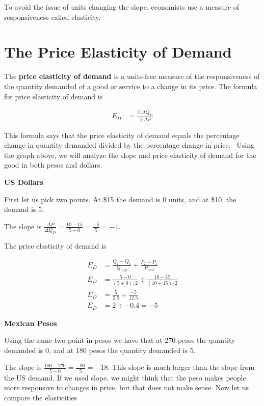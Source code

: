 \documentclass[
]{book}
\begin{document}
To avoid the issue of units changing the slope, economists use a measure of responsiveness called elasticity.

\section{The Price Elasticity of Demand}\label{the-price-elasticity-of-demand}

The \textbf{price elasticity of demand} is a units-free measure of the responsiveness of the quantity demanded of a good or service to a change in its price. The formula for price elasticity of demand is

\begin{align*}
E_D &= \frac{\% \Delta Q_D}{\% \Delta P}
\end{align*}

This formula says that the price elasticity of demand equals the percentage change in quantity demanded divided by the percentage change in price.~
Using the graph above, we will analyze the slope and price elasticity of demand for the good in both pesos and dollars.

\textbf{US Dollars}

First let us pick two points. At \$15 the demand is 0 units, and at \$10, the demand is 5.

The slope is \(\frac{\Delta P}{\Delta Q_D} = \frac{10 - 15}{5 - 0} = \frac{-5}{5} = -1\).

The price elasticity of demand is

\begin{align*}
E_D &= \frac{Q_2 - Q_1}{Q_{mid}}\div \frac{P_2 - P_1}{P_{mid}}\\
E_D &= \frac{5 - 0}{(5+0)/2} \div \frac{10 - 15}{(10+15)/2}\\
E_D &= \frac{5}{2.5}\div \frac{-5}{12.5}\\
E_D &= 2 \div -0.4 = -5 
\end{align*}

\textbf{Mexican Pesos}

Using the same two point in pesos we have that at 270 pesos the quantity demanded is 0, and at 180 pesos the quantity demanded is 5.

The slope is \(\frac{180-270}{5-0} = \frac{-90}{5} = -18\). This slope is much larger than the slope from the US demand. If we used slope, we might think that the peso makes people more responsive to changes in price, but that does not make sense. Now let us compare the elasticities
\end{document}
